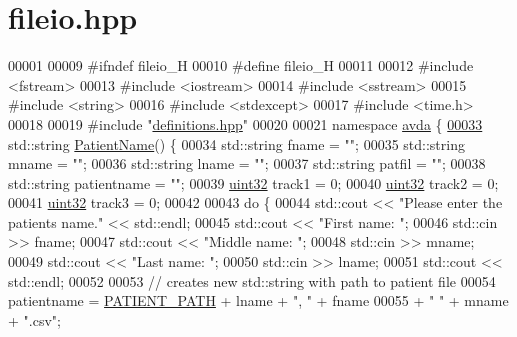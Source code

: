 \hypertarget{fileio_8hpp_source}{\section{fileio.\+hpp}
\label{fileio_8hpp_source}
}

\begin{DoxyCode}
00001 
00009 \textcolor{preprocessor}{#ifndef fileio\_H}
00010 \textcolor{preprocessor}{#define fileio\_H}
00011 
00012 \textcolor{preprocessor}{#include <fstream>}
00013 \textcolor{preprocessor}{#include <iostream>}
00014 \textcolor{preprocessor}{#include <sstream>}
00015 \textcolor{preprocessor}{#include <string>}
00016 \textcolor{preprocessor}{#include <stdexcept>}
00017 \textcolor{preprocessor}{#include <time.h>}
00018 
00019 \textcolor{preprocessor}{#include "\hyperlink{definitions_8hpp}{definitions.hpp}"}
00020 
00021 \textcolor{keyword}{namespace }\hyperlink{namespaceavda}{avda} \{
\hypertarget{fileio_8hpp_source_l00033}{}\hyperlink{namespaceavda_ae20728e7e8ae50bf2f74849e538841ea}{00033}     std::string \hyperlink{namespaceavda_ae20728e7e8ae50bf2f74849e538841ea}{PatientName}() \{
00034         std::string fname = \textcolor{stringliteral}{""};
00035         std::string mname = \textcolor{stringliteral}{""};
00036         std::string lname = \textcolor{stringliteral}{""};
00037         std::string patfil = \textcolor{stringliteral}{""};
00038         std::string patientname = \textcolor{stringliteral}{""};
00039         \hyperlink{definitions_8hpp_a1134b580f8da4de94ca6b1de4d37975e}{uint32} track1 = 0;
00040         \hyperlink{definitions_8hpp_a1134b580f8da4de94ca6b1de4d37975e}{uint32} track2 = 0;
00041         \hyperlink{definitions_8hpp_a1134b580f8da4de94ca6b1de4d37975e}{uint32} track3 = 0;
00042 
00043         \textcolor{keywordflow}{do} \{
00044             std::cout << \textcolor{stringliteral}{"Please enter the patients name."} << std::endl;
00045             std::cout << \textcolor{stringliteral}{"First name: "};
00046             std::cin >> fname;
00047             std::cout << \textcolor{stringliteral}{"Middle name: "};
00048             std::cin >> mname;
00049             std::cout << \textcolor{stringliteral}{"Last name: "};
00050             std::cin >> lname;
00051             std::cout << std::endl;
00052 
00053             \textcolor{comment}{// creates new std::string with path to patient file}
00054             patientname = \hyperlink{definitions_8hpp_a5736990e7ea949fc1971afa00e421f16}{PATIENT\_PATH} + lname + \textcolor{stringliteral}{", "} + fname
00055                 + \textcolor{stringliteral}{" "} + mname + \textcolor{stringliteral}{".csv"};

\end{DoxyCode}
